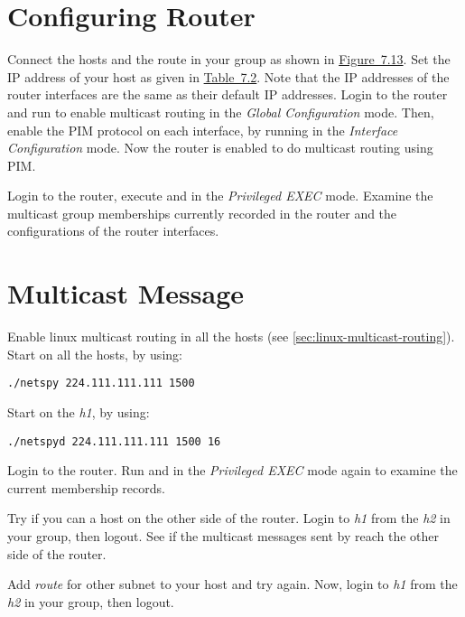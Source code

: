 \documentclass{../UTNetLab}
\begin{document}
\section{Configuring Router}
\label{sec:config-router}
    Connect the hosts and the route in your group as shown in \hyperref[fig:7.13]{Figure~7.13}.
    Set the IP address of your host as given in \hyperref[tab:7.2]{Table~7.2}.
    Note that the IP addresses of the router interfaces are the same as their default IP addresses.
    Login to the router and run  to enable multicast routing in the \textit{Global Configuration} mode.
    Then, enable the PIM protocol on each interface, by running  in the \textit{Interface Configuration} mode.
    Now the router is enabled to do multicast routing using PIM.

    Login to the router, execute  and  in the \textit{Privileged EXEC} mode.
    Examine the multicast group memberships currently recorded in the router and the configurations of the router interfaces.

\section{Multicast Message}
    Enable linux multicast routing in all the hosts (see \autoref{sec:linux-multicast-routing}).\\
    Start  on all the hosts, by using:
    \begin{lstlisting}
./netspy 224.111.111.111 1500
    \end{lstlisting}
    Start  on the \textit{h1}, by using:
    \begin{lstlisting}
./netspyd 224.111.111.111 1500 16
    \end{lstlisting}
    
    Login to the router.
    Run  and  in the \textit{Privileged EXEC} mode again to examine the current membership records.

    Try if you can  a host on the other side of the router.
    Login to \textit{h1} from the \textit{h2} in your group, then logout.
    See if the multicast messages sent by  reach the other side of the router.

    Add \textit{route} for other subnet to your host and try  again.
    Now, login to \textit{h1} from the \textit{h2} in your group, then logout.
    
\end{document}
